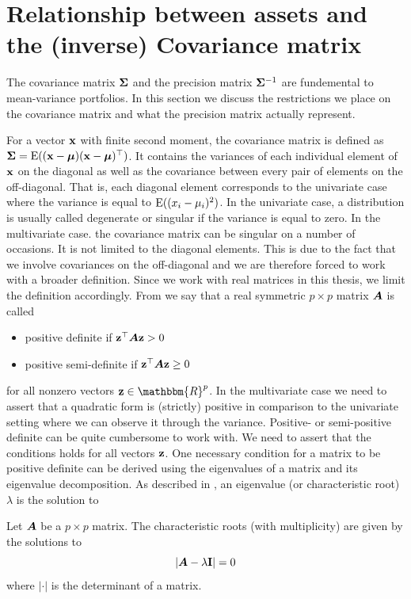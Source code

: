 \documentclass[]{book}\usepackage{knitr}
\begin{document}
\section{Relationship between assets and the (inverse) Covariance matrix}\label{subsec:cov_prec_matrix}
The covariance matrix $\mathbf{\Sigma}$ and the precision matrix $\mathbf{\Sigma}^{-1}$ are fundemental to mean-variance portfolios. In this section we discuss the restrictions we place on the covariance matrix and what the precision matrix actually represent. 

For a vector $\mathbf{x}$ with finite second moment, the covariance matrix is defined as $\mathbf{\Sigma}=\operatorname{E}((\mathbf{x} - \mbox{\boldmath$\mu$})(\mathbf{x} - \mbox{\boldmath$\mu$})^\top)$. 
It contains the variances of each individual element of $\mathbf{x}$ on the diagonal as well as the covariance between every pair of elements on the off-diagonal. 
That is, each diagonal element corresponds to the univariate case where the variance is equal to $\operatorname{E}((x_i - \mu_i)^2)$. 
In the univariate case, a distribution is usually called degenerate or singular if the variance is equal to zero. 
In the multivariate case. the covariance matrix can be singular on a number of occasions. 
It is not limited to the diagonal elements.    
This is due to the fact that we involve covariances on the off-diagonal and we are therefore forced to work with a broader definition.  
Since we work with real matrices in this thesis, we limit the definition accordingly. 
From \citet[ch 14.2]{harville1997matrix} we say that a real symmetric $p\times p$ matrix $\mbox{\boldmath$A$}$ is called 
\begin{itemize}
	\item positive definite if $\mathbf{z}^\top \mbox{\boldmath$A$} \mathbf{z} > 0$
	\item positive semi-definite if $\mathbf{z}^\top \mbox{\boldmath$A$} \mathbf{z} \geq 0$
\end{itemize}
for all nonzero vectors $\bz \in \mathbbm{R}^p$.
In the multivariate case we need to assert that a quadratic form is (strictly) positive in comparison to the univariate setting where we can observe it through the variance. 
Positive- or semi-positive definite can be quite cumbersome to work with. 
We need to assert that the conditions holds for all vectors $\mathbf{z}$. 
One necessary condition for a matrix to be positive definite can be derived using the eigenvalues of a matrix and its eigenvalue decomposition. 
As described in \citet[ch. 21]{harville1997matrix}, an eigenvalue (or characteristic root) $\lambda$ is the solution to 
\begin{definition}\label{def:eigenvalue} 
	Let $\mbox{\boldmath$A$}$ be a $p\times p$ matrix. The characteristic roots (with multiplicity) are given by the solutions to
	\begin{equation*}
		\left|\mbox{\boldmath$A$} - \lambda \mathbf{I}\right| = 0
	\end{equation*}
	where $|\cdot|$ is the determinant of a matrix.
\end{definition} 
\end{document}
